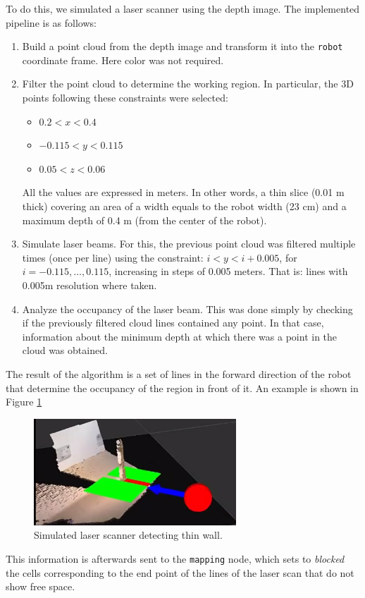 To do this, we simulated a laser scanner using the depth image. The implemented pipeline is as follows:

\begin{enumerate}
\item Build a point cloud from the depth image and transform it into the \texttt{robot} coordinate frame. Here color was not required. 
\item Filter the point cloud to determine the working region. In particular, the 3D points following these constraints were selected:
\begin{itemize}
\item $0.2 < x < 0.4$
\item $-0.115 < y < 0.115 $
\item $0.05 < z < 0.06$
\end{itemize}

All the values are expressed in meters. In other words, a thin slice (0.01 m thick) covering an area of a width equals to the robot width (23 cm) and a maximum depth of 0.4 m (from the center of the robot).

\item Simulate laser beams. For this, the previous point cloud was filtered multiple times (once per line) using the constraint: $ i < y < i+0.005$, for $i = -0.115, \dots, 0.115$, increasing in steps of 0.005 meters. That is: lines with 0.005m resolution where taken. 
\item Analyze the occupancy of the laser beam. This was done simply by checking if the previously filtered cloud lines contained any point. In that case, information about the minimum depth at which there was a point in the cloud was obtained.
\end{enumerate}

The result of the algorithm is a set of lines in the forward direction of the robot that determine the occupancy of the region in front of it. An example is shown in Figure \ref{fig:laser}
\begin{figure}[h]
        \centering
        \includegraphics[height=4cm]{figures/laser.png}
        \caption{Simulated laser scanner detecting thin wall.}
        \label{fig:laser}
\end{figure}

This information is afterwards sent to the \texttt{mapping} node, which sets to \emph{blocked} the cells corresponding to the end point of the lines of the laser scan that do not show free space. 
